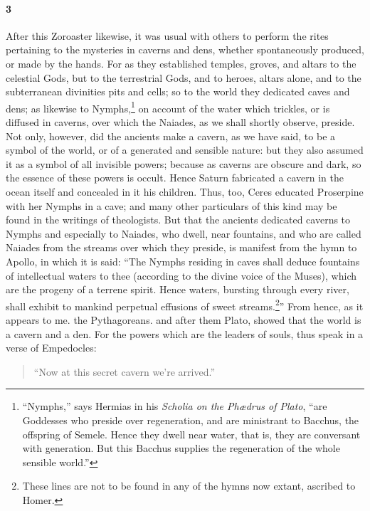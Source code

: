 \documentclass[12pt]{article}
\begin{document}
\paragraph{3} After this Zoroaster likewise, it was usual with others to
perform the rites pertaining to the mysteries in caverns and dens, whether
spontaneously produced, or made by the hands. For as they established temples,
groves, and altars to the celestial Gods, but to the terrestrial Gods, and to
heroes, altars alone, and to the subterranean divinities pits and cells; so to
the world they dedicated caves and dens; as likewise to
Nymphs,\footnote{\-``Nymphs,'' says Hermias in his \textit{Scholia on the
Ph{\ae}drus of Plato}, ``are Goddesses who preside over regeneration, and are
ministrant to Bacchus, the offspring of Semele. Hence they dwell near water,
that is, they are conversant with generation. But this Bacchus supplies the
regeneration of the whole sensible world.''} on account of the water which
trickles, or is diffused in caverns, over which the Naiades, as we shall
shortly observe, preside. Not only, however, did the ancients make a cavern, as
we have said, to be a symbol of the world, or of a generated and sensible
nature: but they also assumed it as a symbol of all invisible powers; because
as caverns are obscure and dark, so the essence of these powers is occult.
Hence Saturn fabricated a cavern in the ocean itself and concealed in it his
children. Thus, too, Ceres educated Proserpine with her Nymphs in a cave; and
many other particulars of this kind may be found in the writings of
theologists. But that the ancients dedicated caverns to Nymphs and especially
to Naiades, who dwell, near fountains, and who are called Naiades from the
streams over which they preside, is manifest from the hymn to Apollo, in which
it is said: ``The Nymphs residing in caves shall deduce fountains of
intellectual waters to thee (according to the divine voice of the Muses), which
are the progeny of a terrene spirit. Hence waters, bursting through every
river, shall exhibit to mankind perpetual effusions of sweet
streams.\footnote{These lines are not to be found in any of the hymns now
extant, ascribed to Homer.}'' From hence, as it appears to me. the
Pythagoreans. and after them Plato, showed that the world is a cavern and a
den. For the powers which are the leaders of souls, thus speak in a verse of
Empedocles:

\begin{verse}
``Now at this secret cavern we're arrived.''
\end{verse}
\end{document}
